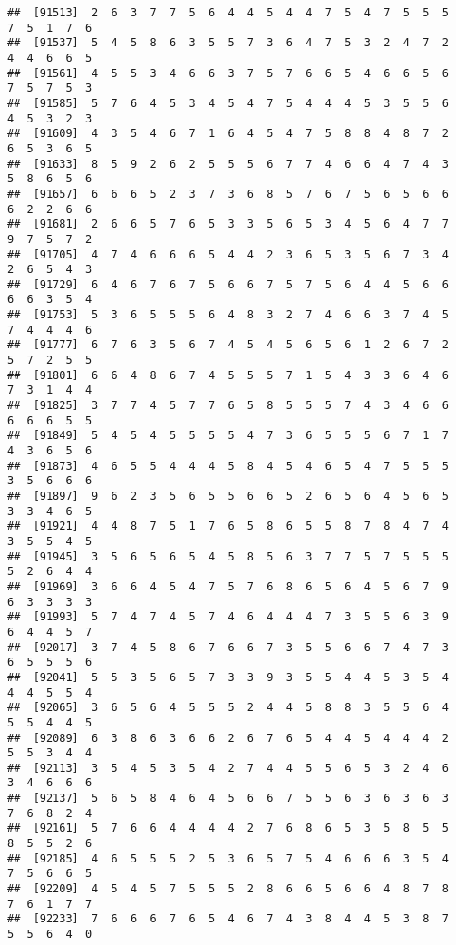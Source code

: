 \documentclass[
]{book}
\begin{document}
\begin{verbatim}
##  [91513]  2  6  3  7  7  5  6  4  4  5  4  4  7  5  4  7  5  5  5  7  5  1  7  6
##  [91537]  5  4  5  8  6  3  5  5  7  3  6  4  7  5  3  2  4  7  2  4  4  6  6  5
##  [91561]  4  5  5  3  4  6  6  3  7  5  7  6  6  5  4  6  6  5  6  7  5  7  5  3
##  [91585]  5  7  6  4  5  3  4  5  4  7  5  4  4  4  5  3  5  5  6  4  5  3  2  3
##  [91609]  4  3  5  4  6  7  1  6  4  5  4  7  5  8  8  4  8  7  2  6  5  3  6  5
##  [91633]  8  5  9  2  6  2  5  5  5  6  7  7  4  6  6  4  7  4  3  5  8  6  5  6
##  [91657]  6  6  6  5  2  3  7  3  6  8  5  7  6  7  5  6  5  6  6  6  2  2  6  6
##  [91681]  2  6  6  5  7  6  5  3  3  5  6  5  3  4  5  6  4  7  7  9  7  5  7  2
##  [91705]  4  7  4  6  6  6  5  4  4  2  3  6  5  3  5  6  7  3  4  2  6  5  4  3
##  [91729]  6  4  6  7  6  7  5  6  6  7  5  7  5  6  4  4  5  6  6  6  6  3  5  4
##  [91753]  5  3  6  5  5  5  6  4  8  3  2  7  4  6  6  3  7  4  5  7  4  4  4  6
##  [91777]  6  7  6  3  5  6  7  4  5  4  5  6  5  6  1  2  6  7  2  5  7  2  5  5
##  [91801]  6  6  4  8  6  7  4  5  5  5  7  1  5  4  3  3  6  4  6  7  3  1  4  4
##  [91825]  3  7  7  4  5  7  7  6  5  8  5  5  5  7  4  3  4  6  6  6  6  6  5  5
##  [91849]  5  4  5  4  5  5  5  5  4  7  3  6  5  5  5  6  7  1  7  4  3  6  5  6
##  [91873]  4  6  5  5  4  4  4  5  8  4  5  4  6  5  4  7  5  5  5  3  5  6  6  6
##  [91897]  9  6  2  3  5  6  5  5  6  6  5  2  6  5  6  4  5  6  5  3  3  4  6  5
##  [91921]  4  4  8  7  5  1  7  6  5  8  6  5  5  8  7  8  4  7  4  3  5  5  4  5
##  [91945]  3  5  6  5  6  5  4  5  8  5  6  3  7  7  5  7  5  5  5  5  2  6  4  4
##  [91969]  3  6  6  4  5  4  7  5  7  6  8  6  5  6  4  5  6  7  9  6  3  3  3  3
##  [91993]  5  7  4  7  4  5  7  4  6  4  4  4  7  3  5  5  6  3  9  6  4  4  5  7
##  [92017]  3  7  4  5  8  6  7  6  6  7  3  5  5  6  6  7  4  7  3  6  5  5  5  6
##  [92041]  5  5  3  5  6  5  7  3  3  9  3  5  5  4  4  5  3  5  4  4  4  5  5  4
##  [92065]  3  6  5  6  4  5  5  5  2  4  4  5  8  8  3  5  5  6  4  5  5  4  4  5
##  [92089]  6  3  8  6  3  6  6  2  6  7  6  5  4  4  5  4  4  4  2  5  5  3  4  4
##  [92113]  3  5  4  5  3  5  4  2  7  4  4  5  5  6  5  3  2  4  6  3  4  6  6  6
##  [92137]  5  6  5  8  4  6  4  5  6  6  7  5  5  6  3  6  3  6  3  7  6  8  2  4
##  [92161]  5  7  6  6  4  4  4  4  2  7  6  8  6  5  3  5  8  5  5  8  5  5  2  6
##  [92185]  4  6  5  5  5  2  5  3  6  5  7  5  4  6  6  6  3  5  4  7  5  6  6  5
##  [92209]  4  5  4  5  7  5  5  5  2  8  6  6  5  6  6  4  8  7  8  7  6  1  7  7
##  [92233]  7  6  6  6  7  6  5  4  6  7  4  3  8  4  4  5  3  8  7  5  5  6  4  0

\end{verbatim}
\end{document}
